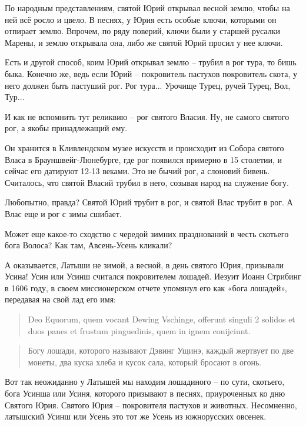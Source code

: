    По народным представлениям, святой Юрий открывал весной землю, чтобы на ней всё росло и цвело. В песнях, у Юрия есть особые ключи, которыми он отпирает землю. Впрочем, по ряду поверий, ключи были у старшей русалки Марены, и землю открывала она, либо же святой Юрий просил у нее ключи.

   Есть и другой способ, коим Юрий открывал землю – трубил в рог тура, то бишь быка. Конечно же, ведь если Юрий – покровитель пастухов покровитель скота, у него должен быть пастуший рог. Рог тура... Урочище Турец, ручей Турец, Вол, Тур...

   И как не вспомнить тут реликвию – рог святого Власия. Ну, не самого святого рог, а якобы принадлежащий ему.

   
   Он хранится в Кливлендском музее искусств и происходит из Собора святого Власа в Брауншвейг-Люнебурге, где рог появился примерно в 15 столетии, и сейчас его датируют 12-13 веками. Это не бычий рог, а слоновий бивень. Считалось, что святой Власий трубил в него, созывая народ на служение богу.

   Любопытно, правда? Святой Юрий трубит в рог, и святой Влас трубит в рог. А Влас еще и рог с зимы сшибает.

   Может еще какое-то сходство с чередой зимних празднований в честь скотьего бога Волоса? Как там, Авсень-Усень кликали?

   А оказывается, Латыши не зимой, а весной, в день святого Юрия, призывали Усина! Усин или Усинш считался покровителем лошадей. Иезуит Иоанн Стрибинг в 1606 году, в своем миссионерском отчете упомянул его как «бога лошадей», передавая на свой лад его имя:

\begin{quotation}
\noindent Deo Equorum, quem vocant Dewing Vschinge, offerunt singuli 2 solidos et duos panes et frustum pinguedinis, quem in ignem conijciunt.\end{quotation}

\begin{quotation}
\noindent Богу лошади, которого называют Дэвинг Ущинэ, каждый жертвует по две монеты, два куска хлеба и кусок сала, который бросают в огонь.
\end{quotation}


   Вот так неожиданно у Латышей мы находим лошадиного – по сути, скотьего, бога Усинша или Усиня, которого призывают в песнях, приуроченных ко дню Святого Юрия. Святого Юрия – покровителя пастухов и животных. Несомненно, латышский Усинш или Усень это тот же Усень из южнорусских овсенек.

